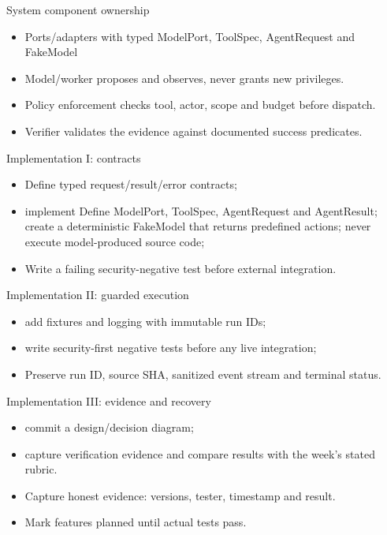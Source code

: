 \documentclass[aspectratio=169,10pt]{beamer}
\begin{document}
\begin{frame}{System component ownership}
\small
\begin{itemize}
\item Ports/adapters with typed ModelPort, ToolSpec, AgentRequest and FakeModel
\item Model/worker proposes and observes, never grants new privileges.
\item Policy enforcement checks tool, actor, scope and budget before dispatch.
\item Verifier validates the evidence against documented success predicates.
\end{itemize}

\end{frame}

\begin{frame}{Implementation I: contracts}
\small
\begin{itemize}
\item Define typed request/result/error contracts;
\item implement Define ModelPort, ToolSpec, AgentRequest and AgentResult; create a deterministic FakeModel that returns predefined actions; never execute model-produced source code;
\item Write a failing security-negative test before external integration.
\end{itemize}

\end{frame}

\begin{frame}{Implementation II: guarded execution}
\small
\begin{itemize}
\item add fixtures and logging with immutable run IDs;
\item write security-first negative tests before any live integration;
\item Preserve run ID, source SHA, sanitized event stream and terminal status.
\end{itemize}

\end{frame}

\begin{frame}{Implementation III: evidence and recovery}
\small
\begin{itemize}
\item commit a design/decision diagram;
\item capture verification evidence and compare results with the week's stated rubric.
\item Capture honest evidence: versions, tester, timestamp and result.
\item Mark features planned until actual tests pass.
\end{itemize}

\end{frame}
\end{document}
